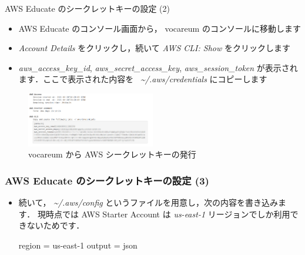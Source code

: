 \documentclass[unicode,11pt]{beamer}
\begin{document}
\begin{frame}{AWS Educate のシークレットキーの設定 (2)}

\begin{itemize}
    \item AWS Educate のコンソール画面から， vocareum のコンソールに移動します
    \item \emph{Account Details} をクリックし，続いて \emph{AWS CLI: Show} をクリックします
    \item \emph{aws\_access\_key\_id}, \emph{aws\_secret\_access\_key}, \emph{aws\_session\_token} が表示されます．ここで表示された内容を \emph{~\textasciitilde/.aws/credentials} にコピーします
\end{itemize}

\begin{figure}
    \centering
    \includegraphics[width=0.5\textwidth]{imgs/vocareum_secret.png}
    \caption{vocareum から AWS シークレットキーの発行}
\end{figure}

\end{frame}

\begin{frame}[fragile]
\frametitle{AWS Educate のシークレットキーの設定 (3)}

\begin{itemize}
    \item 続いて， \emph{\textasciitilde/.aws/config} というファイルを用意し，次の内容を書き込みます．
    現時点では AWS Starter Account は \emph{us-east-1} リージョンでしか利用できないためです．
    
    \begin{semiverbatim}
    region = us-east-1
    output = json
    \end{semiverbatim}
\end{itemize}

\end{frame}
\end{document}
